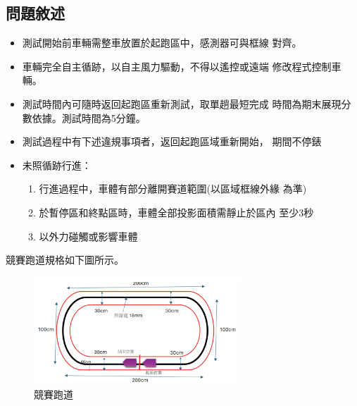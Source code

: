 \documentclass[12pt]{article}       %
\begin{document}
\subsection{問題敘述} 
\hspace{2em}
\begin{itemize}
    \item 測試開始前車輛需整車放置於起跑區中，感測器可與框線 
    對齊。
    \item 車輛完全自主循跡，以自主風力驅動，不得以遙控或遠端 
    修改程式控制車輛。
    \item 測試時間內可隨時返回起跑區重新測試，取單趟最短完成 
    時間為期末展現分數依據。測試時間為5分鐘。
    \item 測試過程中有下述違規事項者，返回起跑區域重新開始， 
    期間不停錶
    \item 未照循跡行進：
    \begin{enumerate}
        \item 行進過程中，車體有部分離開賽道範圍(以區域框線外緣 
        為準)
        \item 於暫停區和終點區時，車體全部投影面積需靜止於區內 
        至少3秒
        \item 以外力碰觸或影響車體
    \end{enumerate}
\end{itemize}

競賽跑道規格如下圖所示。
\begin{figure}[H]
    \centering
    \includegraphics[width=0.7\textwidth]{1.jpg}     %
    \caption{競賽跑道}    %
    \label{fig:1}    %
\end{figure}
\end{document}
